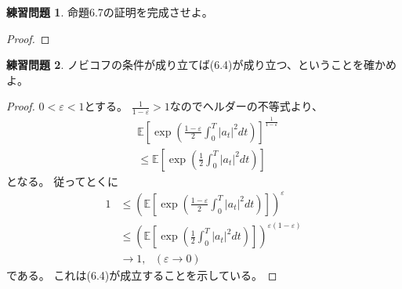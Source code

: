 \documentclass[uplatex]{jsarticle}
\theoremstyle{definition}
\newtheorem{prob}[prob]{練習問題}
\def\ep{\varepsilon}
\def\E{\mathbb{E}}
\begin{document}
\begin{prob}\label{prob: 6.2}
  命題6.7の証明を完成させよ。
\end{prob}

\begin{proof}

\end{proof}


















\begin{prob}\label{prob: 6.3}
  ノビコフの条件が成り立てば(6.4)が成り立つ、ということを確かめよ。
\end{prob}

\begin{proof}
  \(0< \ep < 1\)とする。
  \(\frac{1}{1-\ep} > 1\)なのでヘルダーの不等式より、
  \begin{align*}
    &\E\left[ \exp \left( \frac{1-\ep}{2} \int_0^T|a_t|^2dt
    \right)\right]^{\frac{1}{1-\ep}} \\
    &\leq
    \E\left[ \exp \left( \frac{1}{2} \int_0^T|a_t|^2dt \right)\right]
  \end{align*}
  となる。
  従ってとくに
  \begin{align*}
    1 &\leq \left( \E\left[ \exp \left( \frac{1-\ep}{2} \int_0^T|a_t|^2dt
    \right)\right] \right)^{\ep} \\
    &\leq
    \left( \E\left[ \exp \left( \frac{1}{2} \int_0^T|a_t|^2dt
    \right)\right]\right)^{\ep (1-\ep)} \\
    &\to 1 , \ \ \ (\ep \to 0)
  \end{align*}
  である。
  これは(6.4)が成立することを示している。
\end{proof}
\end{document}
